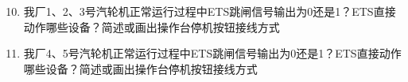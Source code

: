 \documentclass{book}
\begin{document}
\section{}
\begin{enumerate}
	\setcounter{enumi}{9}
	\item 我厂1、2、3号汽轮机正常运行过程中ETS跳闸信号输出为0还是1？ETS直接动作哪些设备？简述或画出操作台停机按钮接线方式
	\item 我厂4、5号汽轮机正常运行过程中ETS跳闸信号输出为0还是1？ETS直接动作哪些设备？简述或画出操作台停机按钮接线方式
\end{enumerate}
\end{document}
